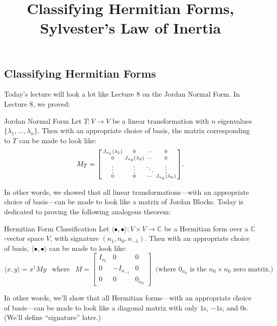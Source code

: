 \title{Classifying Hermitian Forms, Sylvester's Law of Inertia}



\subsection{Classifying Hermitian Forms}

Today's lecture will look a lot like Lecture 8 on the Jordan Normal Form.  In Lecture 8, we proved:

\begin{theorem}{Jordan Normal Form}
    Let $T: V \to V$ be a linear transformation with $n$ eigenvalues $\{\lambda_1, \dots, \lambda_n\}$.  Then with an appropriate choice of basis, the matrix corresponding to $T$ can be made to look like:
    \[ M_T = \begin{bsmallmatrix} J_{n_1}(\lambda_1) & 0 & \cdots & 0 \\ 0 & J_{n_2}(\lambda_2) & \cdots & 0 \\ \vdots & \vdots & \ddots & \vdots \\ 0 & 0 & \cdots & J_{n_k}(\lambda_k) \end{bsmallmatrix}. \]
\end{theorem} \vspace{-0.45cm}

In other words, we showed that all linear transformations---with an appropriate choice of basis---can be made to look like a matrix of Jordan Blocks.  Today is dedicated to proving the following analogous theorem:

\begin{theorem}{Hermitian Form Classification}
    Let $\langle \bullet, \bullet \rangle : V \times V \to \mathbb{C}$ be a Hermitian form over a $\mathbb{C}$-vector space $V$, with signature $(n_1, n_0, n_{-1})$.  Then with an appropriate choice of basis, $\langle \bullet, \bullet \rangle$ can be made to look like:
    \[ \langle x, y \rangle = x^{\dagger}My ~~ \text{ where } ~~ M = \begin{bmatrix}
        I_{n_1} & 0 & 0 \\ 0 & -I_{n_{-1}} & 0 \\ 0 & 0 & 0_{n_0}
    \end{bmatrix} ~ \text{ (where $0_{n_0}$ is the $n_0 \times n_0$ zero matrix.)} \]
\end{theorem} \vspace{-0.45cm}

In other words, we'll show that all Hermitian forms---with an appropriate choice of basis---can be made to look like a diagonal matrix with only $1$s, $-1$s, and $0$s.  (We'll define ``signature'' later.)

